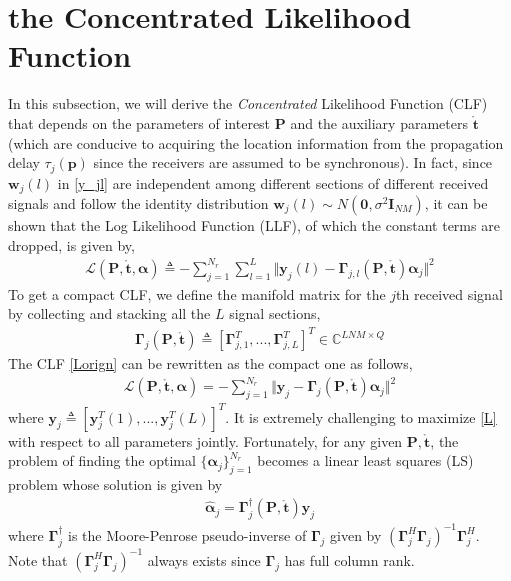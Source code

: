 \documentclass[review]{elsarticle}
\begin{document}
\section{the Concentrated Likelihood Function}
In this subsection, we will derive the \emph{Concentrated} Likelihood Function (CLF) that depends on the parameters of interest $\boldsymbol{P}$ and the auxiliary parameters $\mathring{\boldsymbol{t}}$ (which are conducive to acquiring the location information from the propagation delay $\tau_j(\boldsymbol{p})$ since the receivers are assumed to be synchronous). In fact, since $\boldsymbol{w}_j(l)$ in \eqref{y_jl} are independent among different sections of different received signals and follow the identity distribution $\boldsymbol{w}_j(l)\sim N(\boldsymbol{0},\sigma^2\boldsymbol{I}_{NM})$, it can be shown that the Log Likelihood Function (LLF), of which the constant terms are dropped, is given by,
\begin{align}\label{Lorign}
\mathcal{L}(\boldsymbol{P},\mathring{\boldsymbol{t}},\boldsymbol{\alpha})\triangleq-\sum_{j=1}^{N_r}\sum_{l=1}^L\Vert \boldsymbol{y}_j(l)-\boldsymbol{\Gamma}_{j,l}(\boldsymbol{P},\mathring{\boldsymbol{t}})\boldsymbol{\alpha}_j\Vert^2
\end{align}
To get a compact CLF, we define the manifold matrix for the $j$th received signal by collecting and stacking all the $L$ signal sections,
\begin{align}\label{Gammaj}
    \boldsymbol{\Gamma}_{j}(\boldsymbol{P},\mathring{\boldsymbol{t}})\triangleq[\boldsymbol{\Gamma}_{j,1}^T,...,\boldsymbol{\Gamma}_{j,L}^T]^T\in \mathbb{C}^{LNM\times Q}
\end{align}
The CLF \eqref{Lorign} can be rewritten as the compact one as follows,
\begin{align}\label{L}
    \mathcal{L}(\boldsymbol{P},\mathring{\boldsymbol{t}},\boldsymbol{\alpha})=-\sum_{j=1}^{N_r}\Vert \boldsymbol{y}_j-\boldsymbol{\Gamma}_{j}(\boldsymbol{P},\mathring{\boldsymbol{t}})\boldsymbol{\alpha}_j\Vert^2
\end{align}
where $\boldsymbol{y}_j\triangleq[\boldsymbol{y}_j^T(1),...,\boldsymbol{y}_j^T(L)]^T$. It is extremely challenging to maximize \eqref{L} with respect to all parameters jointly. Fortunately, for any given $\boldsymbol{P},\mathring{\boldsymbol{t}}$, the problem of finding the optimal $\lbrace \boldsymbol{\alpha}_j\rbrace _{j=1}^{N_r}$ becomes a linear least squares (LS) problem \cite{Golub1973The} whose solution is given by
\begin{align}
    \hat{\boldsymbol{\alpha}}_j=\boldsymbol{\Gamma}_{j}^\dagger(\boldsymbol{P},\mathring{\boldsymbol{t}})\boldsymbol{y}_j
\end{align}
where $\boldsymbol{\Gamma}_{j}^\dagger$ is the Moore-Penrose pseudo-inverse of $\boldsymbol{\Gamma}_{j}$ given by $(\boldsymbol{\Gamma}_{j}^H\boldsymbol{\Gamma}_{j})^{-1}\boldsymbol{\Gamma}_{j}^H$. Note that $(\boldsymbol{\Gamma}_{j}^H\boldsymbol{\Gamma}_{j})^{-1}$ always exists since $\boldsymbol{\Gamma}_{j}$ has full column rank. 
\end{document}
